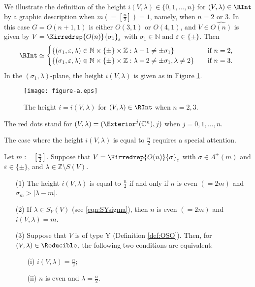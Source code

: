 \begin{example}
\label{ex:iVlmdfig}
We illustrate the definition of the height
 $i(V,\lambda) \in \{0,1,\ldots,n\}$
 for $(V,\lambda) \in \RInt$
 by a graphic description 
 when $m(=[\frac n 2])=1$, 
 namely,
 when $n=2$ or $3$.  
In this case $G=O(n+1,1)$ is either $O(3,1)$ or $O(4,1)$, 
 and $V \in \widehat{O(n)}$ is given 
 by $V=\Kirredrep{O(n)}{\sigma_1}_{\varepsilon}$
 with $\sigma_1 \in {\mathbb{N}}$ and $\varepsilon \in \{\pm\}$.  
Then 
\begin{equation*}
\RInt \simeq
 \begin{cases}
\{(\sigma_1, \varepsilon,\lambda) \in {\mathbb{N}} \times \{\pm\}\times {\mathbb{Z}}:
\lambda-1 \ne \pm \sigma_1\}
\quad
 &\text{if $n=2$, }
\\
\{(\sigma_1, \varepsilon,\lambda) \in {\mathbb{N}} \times \{\pm\}\times {\mathbb{Z}}:
\lambda-2 \ne \pm \sigma_1, \lambda \ne 2\}
\quad
 &\text{if $n=3$.  }
\end{cases}
\end{equation*}
In the $(\sigma_1, \lambda)$-plane,
 the height $i(V,\lambda)$ is given as in Figure \ref{fig:iVlmd}.  

\renewcommand{\figurename}{Figure}
\begin{figure}[H]
\begin{center}
\texttt{[image: figure-a.eps]}
\end{center}
\caption{The height $i=i(V,\lambda)$
 for $(V,\lambda) \in \RInt$
 when $n=2,3$. }
\label{fig:iVlmd}
\end{figure}
\renewcommand{\figurename}{Diagram}

The red dots stand for 
 $(V,\lambda)=(\Exterior^j({\mathbb{C}}^n), j)$ 
 when $j=0,1,\ldots,n$. 
\end{example}


The case 
 where the height $i(V,\lambda)$ is equal to $\frac n 2$
 requires a special attention. 
\begin{lemma}
\label{lem:isig}
Let $m:=[\frac n 2]$.  
Suppose that $V =\Kirredrep {O(n)}{\sigma}_{\varepsilon}$ 
 with $\sigma \in \Lambda^+(m)$
 and $\varepsilon \in \{\pm\}$, 
 and $\lambda \in {\mathbb{Z}} \setminus S(V)$.  
\begin{enumerate}
\item[{\rm{(1)}}]
The height $i(V, \lambda)$ is equal to $\frac n 2$
 if and only if $n$ is even
 $(=2m)$
 and $\sigma_{m} > |\lambda -m|$.  
\item[{\rm{(2)}}]
If $\lambda \in S_Y(V)$
 (see \eqref{eqn:SYsigma}), 
 then $n$ is even $(=2m)$
 and $i(V, \lambda)=m$.  
\item[{\rm{(3)}}]
Suppose that $V$ is of type Y
 (Definition \ref{def:OSO}).  
Then,  
 for $(V, \lambda) \in \Reducible$, 
 the following two conditions are equivalent:
\begin{enumerate}
\item[{\rm{(i)}}]
$i(V,\lambda) = \frac n 2$;
\item[{\rm{(ii)}}]
$n$ is even 
 and $\lambda = \frac n 2$.  
\end{enumerate}
\end{enumerate}
\end{lemma}


